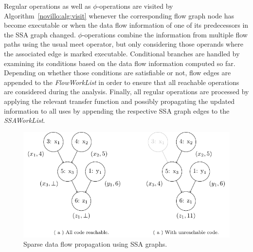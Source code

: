 Regular operations as well as $\phi$-operations are visited by
Algorithm~\ref{novillo:alg:visit} whenever the corresponding flow graph node has
become executable or when the data flow information of one of its predecessors
in the SSA graph changed. $\phi$-operations combine the information from
multiple flow paths using the usual meet operator, but only considering those
operands where the associated edge is marked executable. Conditional branches
are handled by examining its conditions based on the data flow information
computed so far. Depending on whether those conditions are satisfiable or not,
flow edges are appended to the \emph{FlowWorkList} in order to ensure that all
reachable operations are considered during the analysis. Finally, all regular
operations are processed by applying the relevant transfer function and possibly
propagating the updated information to all uses by appending the respective
SSA graph edges to the \emph{SSAWorkList}.

\begin{figure}[t!]
  \begin{center}
    \includegraphics{ssa_propagation}
    \subfigure{\label{novillo:fig:ssa_propagation:a}}
    \subfigure{\label{novillo:fig:ssa_propagation:b}}
  \end{center}
  \vspace{-2em}
  \caption{Sparse data flow propagation using SSA graphs.}
  \label{novillo:fig:ssa_propagation}
\end{figure}

